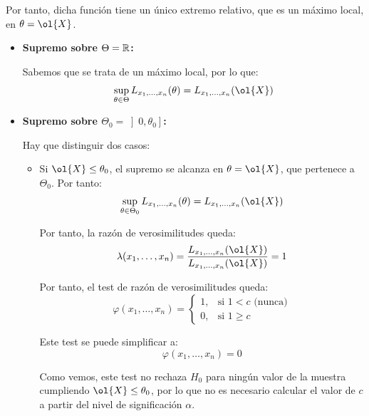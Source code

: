 \begin{ejemplo}
    Por tanto, dicha función tiene un único extremo relativo, que es un máximo local, en ${\theta} = \ol{X}$.
    \begin{itemize}
        \item \textbf{Supremo sobre $\Theta=\mathbb{R}$:} 
        
        Sabemos que se trata de un máximo local, por lo que:
        \begin{equation*}
            \sup\limits_{\theta\in\Theta} L_{x_1, \dots, x_n}(\theta) = L_{x_1, \dots, x_n}(\ol{X})
        \end{equation*}

        \item \textbf{Supremo sobre $\Theta_0=\left]0,\theta_0\right]$:}
        
        Hay que distinguir dos casos:
        \begin{itemize}
            \item Si $\ol{X} \leq \theta_0$, el supremo se alcanza en $\theta = \ol{X}$, que pertenece a $\Theta_0$. Por tanto:
            \begin{equation*}
                \sup\limits_{\theta\in\Theta_0} L_{x_1, \dots, x_n}(\theta) = L_{x_1, \dots, x_n}(\ol{X})
            \end{equation*}

            Por tanto, la razón de verosimilitudes queda:
            \begin{equation*}
                \lambda(x_1, \dots, x_n) = \frac{L_{x_1, \dots, x_n}(\ol{X})}{L_{x_1, \dots, x_n}(\ol{X})} = 1
            \end{equation*}

            Por tanto, el test de razón de verosimilitudes queda:
            \begin{equation*}
                \varphi(x_1, \dots, x_n) =
                \begin{cases}
                    1, & \text{si } 1 < c \text{ (nunca)} \\
                    0, & \text{si } 1 \geq c
                \end{cases}
            \end{equation*}

            Este test se puede simplificar a:
            \begin{equation*}
                \varphi(x_1, \dots, x_n) = 0
            \end{equation*}

            Como vemos, este test no rechaza $H_0$ para ningún valor de la muestra cumpliendo $\ol{X} \leq \theta_0$, por lo que no es necesario calcular el valor de $c$ a partir del nivel de significación $\alpha$.


\end{itemize}
\end{itemize}
\end{ejemplo}
